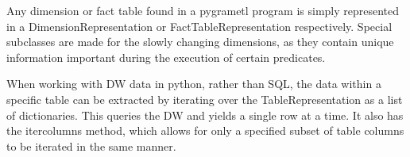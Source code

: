 Any dimension or fact table found in a pygrametl program is simply represented in a DimensionRepresentation or FactTableRepresentation respectively. Special subclasses are made for the slowly changing dimensions, as they contain unique information important during the execution of certain predicates.

When working with DW data in python, rather than SQL, the data within a specific table can be extracted  by iterating over the TableRepresentation as a list of dictionaries. This queries the DW and yields a single row at a time. It also has the itercolumns method, which allows for only a specified subset of table columns to be iterated in the same manner.

